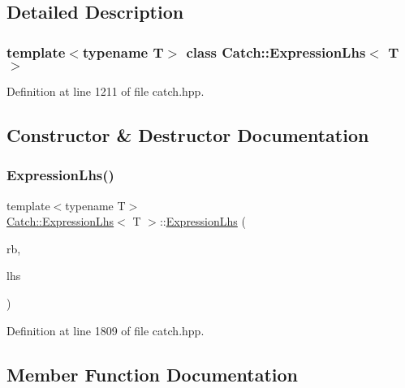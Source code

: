 \subsection{Detailed Description}
\subsubsection*{template$<$typename T$>$\newline
class Catch\+::\+Expression\+Lhs$<$ T $>$}



Definition at line 1211 of file catch.\+hpp.



\subsection{Constructor \& Destructor Documentation}
\hypertarget{class_catch_1_1_expression_lhs_aa829588def6146a94fb75de9c4cc482a}{}\label{class_catch_1_1_expression_lhs_aa829588def6146a94fb75de9c4cc482a} 
\subsubsection{\texorpdfstring{Expression\+Lhs()}{ExpressionLhs()}}
{\footnotesize\ttfamily template$<$typename T$>$ \\
\hyperlink{class_catch_1_1_expression_lhs}{Catch\+::\+Expression\+Lhs}$<$ T $>$\+::\hyperlink{class_catch_1_1_expression_lhs}{Expression\+Lhs} (\begin{DoxyParamCaption}\item[{\hyperlink{class_catch_1_1_result_builder}{Result\+Builder} \&}]{rb,  }\item[{T}]{lhs }\end{DoxyParamCaption})\hspace{0.3cm}{\ttfamily [inline]}}



Definition at line 1809 of file catch.\+hpp.



\subsection{Member Function Documentation}
\hypertarget{class_catch_1_1_expression_lhs_a13d2551a927790284fb5ddf1ee2c9079}{}\label{class_catch_1_1_expression_lhs_a13d2551a927790284fb5ddf1ee2c9079} 
